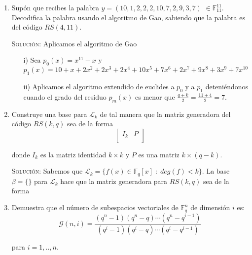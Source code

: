 \documentclass[letterpaper,11pt]{article}
\begin{document}
\begin{enumerate}
    \newpage
    \item Supón que recibes la palabra $y = (10, 1, 2, 2, 2, 10, 7, 2, 9, 3, 7)$
    $\in \mathbb{F}^{11}_{11}$. Decodifica la palabra usando el algoritmo de
    Gao, sabiendo que la palabra es del código $RS(4,11)$.
    
    \textsc{Solución:} Aplicamos el algoritmo de Gao
    \begin{enumerate}
        \item[i)] Sea $p_{0}(x) = x^{11}-x$ y $p_{1}(x) = 10 + x + 2x^{2} 
        + 2x^{3} + 2x^{4} + 10x^{5} + 7x^{6} + 2x^{7} + 9x^{8} + 3x^{9} 
        + 7x^{10}$
        \item[ii)] Aplicamos el algoritmo extendido de euclides a $p_{0}$ y a 
        $p_{1}$ deteniéndonos cuando el grado del residuo $p_{m}(x)$ es menor
        que $\frac{q+k}{2} = \frac{11+4}{2} = 7$.
    \end{enumerate}

    \item Construye una base para $\mathcal{L}_{k}$ de tal manera que la matriz
    generadora del código $RS(k, q)$ sea de la forma 
    \begin{equation}
    \begin{bmatrix}
    I_{k} & P\\
    \end{bmatrix}
    \end{equation}
    
    donde $I_{k}$ es la matriz identidad $k \times k$ y $P$ es una matriz 
    $k \times (q-k)$. 
    
    \textsc{Solución:} Sabemos que $\mathcal{L}_{k} = \{f(x) \in 
    \mathbb{F}_{q}[x] \; : \; deg(f) < k\}$. La base $\beta = \{\}$ para 
$\mathcal{L}_{k}$ hace que la matriz generadora para 
    $RS(k,q)$ sea de la forma
    
    \item Demuestra que el número de subespacios vectoriales de 
    $\mathbb{F}^{n}_{q}$ de dimensión $i$ es: 
    \begin{equation}
        \mathcal{G}(n, i) = \frac{(q^{n}-1)(q^{n}-q)\cdots(q^{n}-q^{i-1})}
        {(q^{i}-1)(q^{i}-q)\cdots(q^{i}-q^{i-1})}
    \end{equation}
    
    para $i = 1,.., n$.
    

\end{enumerate}
\end{document}
